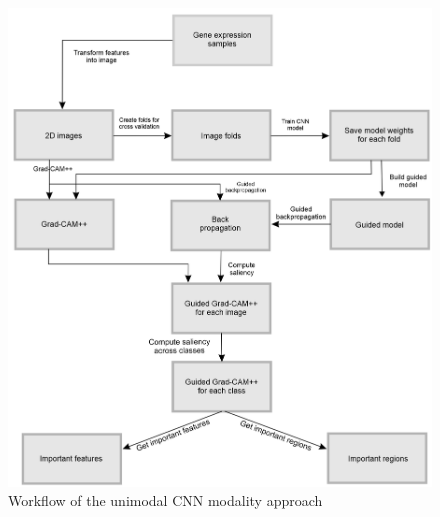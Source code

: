 \begin{figure}
	\centering
	\includegraphics[scale=0.9]{images/wf_2D_CNN.png}
    \caption{Workflow of the unimodal CNN modality approach}	
	\label{fig:workflow_2D_CNN}
\end{figure}


